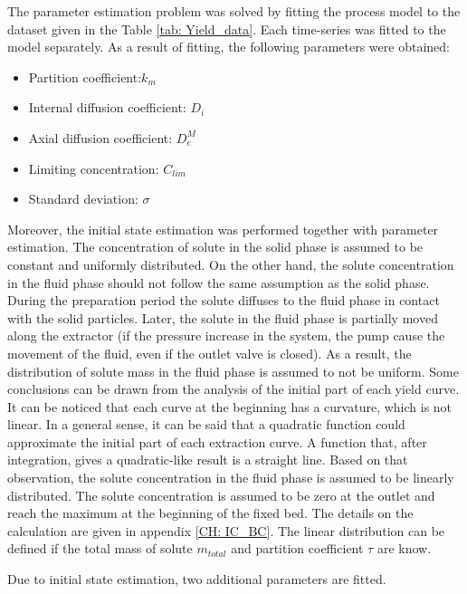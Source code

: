 \documentclass[../Article_Model_Parameters.tex]{subfiles}
\begin{document}
	
	\label{CH: Results}

    The parameter estimation problem was solved by fitting the process model to the dataset given in the Table \ref{tab: Yield_data}. Each time-series was fitted to the model separately. As a result of fitting, the following parameters were obtained:

    \begin{itemize}
        \item Partition coefficient:\qquad\quad\qquad$k_m$
        \item Internal diffusion coefficient: \quad$D_i$
        \item Axial diffusion coefficient: \qquad$D_e^M$
        \item Limiting concentration: \quad\qquad$C_{lim}$
        \item Standard deviation: \qquad\qquad\quad$\sigma$
    \end{itemize}

    Moreover, the initial state estimation was performed together with parameter estimation. The concentration of solute in the solid phase is assumed to be constant and uniformly distributed. On the other hand, the solute concentration in the fluid phase should not follow the same assumption as the solid phase. During the preparation period the solute diffuses to the fluid phase in contact with the solid particles. Later, the solute in the fluid phase is partially moved along the extractor (if the pressure increase in the system, the pump cause the movement of the fluid, even if the outlet valve is closed). As a result, the distribution of solute mass in the fluid phase is assumed to not be uniform. Some conclusions can be drawn from the analysis of the initial part of each yield curve. It can be noticed that each curve at the beginning has a curvature, which is not linear. In a general sense, it can be said that a quadratic function could approximate the initial part of each extraction curve. A function that, after integration, gives a quadratic-like result is a straight line. Based on that observation, the solute concentration in the fluid phase is assumed to be linearly distributed. The solute concentration is assumed to be zero at the outlet and reach the maximum at the beginning of the fixed bed. The details on the calculation are given in appendix \ref{CH: IC_BC}. The linear distribution can be defined if the total mass of solute $m_{total}$ and partition coefficient $\tau$ are know.
    
    Due to initial state estimation, two additional parameters are fitted.
\end{document}
